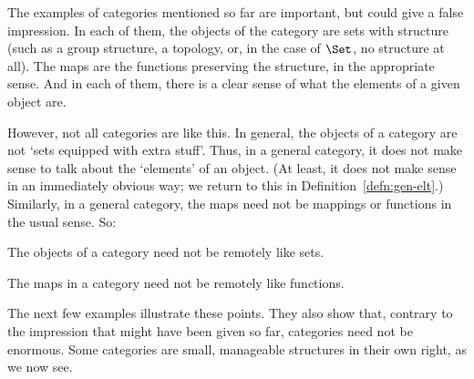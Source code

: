 The examples of categories mentioned so far are important, but could give a
false impression.  In each of them, the objects of the category are sets
with structure (such as a group structure, a topology, or, in the case
of $\Set$, no structure at all).  The maps are the functions preserving the
structure, in the appropriate sense.  And in each of them, there is a
clear sense of what the elements of a given object are.

However, not all categories are like this.  In general, the objects of a
category are not `sets equipped with extra stuff'.  Thus, in a general
category, it does not make sense to talk about the `elements' of an object.
(At least, it does not make sense in an immediately obvious way; we return
to this in Definition~\ref{defn:gen-elt}.)  Similarly, in a general
category, the maps need not be mappings or functions in the usual sense.
So:

\begin{slogan}
The objects of a category need not be remotely like sets.%
%
%
\end{slogan}
% 
\begin{slogan}
The maps in a category need not be remotely like functions.
%
%
\end{slogan}
% 
The next few examples illustrate these points.  They also show that,
contrary to the impression that might have been given so far, categories
need not be enormous.  Some categories are small, manageable structures in
their own right, as we now see.

